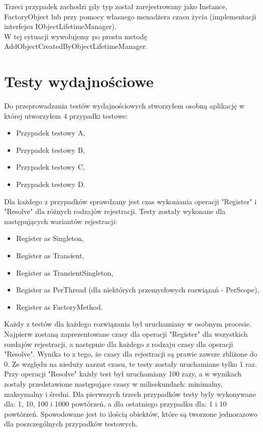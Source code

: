 \documentclass[12pt]{article}
\begin{document}
Trzeci przypadek zachodzi gdy typ został zarejestrowany jako Instance, FactoryObject lub przy pomocy własnego menadżera czasu życia (implementacji interfejsu IObjectLifetimeManager).\\
W tej sytuacji wywołujemy po prostu metodę AddObjectCreatedByObjectLifetimeManager.



\clearpage
\section{Testy wydajnościowe}
Do przeprowadzania testów wydajnościowych stworzyłem osobną aplikację w której utworzyłem 4 przypadki testowe:
\begin{itemize}
	\item Przypadek testowy A,
	\item Przypadek testowy B,
	\item Przypadek testowy C,
	\item Przypadek testowy D.
\end{itemize}
Dla każdego z przypadków sprawdzany jest czas wykoniania operacji "Register" i "Resolve" dla różnych rodzajów rejestracji. Testy zostały wykonane dla następujących wariantów rejestracji:
\begin{itemize}
	\item Register as Singleton,
	\item Register as Transient,
	\item Register as TransientSingleton,
	\item Register as PerThread (dla niektórych przemysłowych rozwiązań - PerScope),
	\item Register as FactoryMethod.
\end{itemize}
Każdy z testów dla każdego rozwiązania był uruchamiany w osobnym procesie. Najpierw zostaną zaprezentowane czasy dla operacji "Register" dla wszystkich rozdajów rejestracji, a następnie dla każdego z rodzaju czasy dla operacji "Resolve". Wynika to z tego, że czasy dla rejestracji są prawie zawsze zbliżone do 0. Ze względu na nieduży narzut czasu, te testy zostały uruchamiane tylko 1 raz. Przy operacji "Resolve" każdy test był uruchamiany 100 razy, a w wynikach zostały przedstawione następujące czasy w milisekundach: minimalny, maksymalny i średni. Dla pierwszych trzech przypadków testy były wykonywane dla: 1, 10, 100 i 1000 powtórzeń, a dla ostatniego przypadku dla: 1 i 10 powtórzeń. Spowodowane jest to ilością obiektów, które są tworzone jednorazowo dla poszczególnych przypadków testowych.
\end{document}
